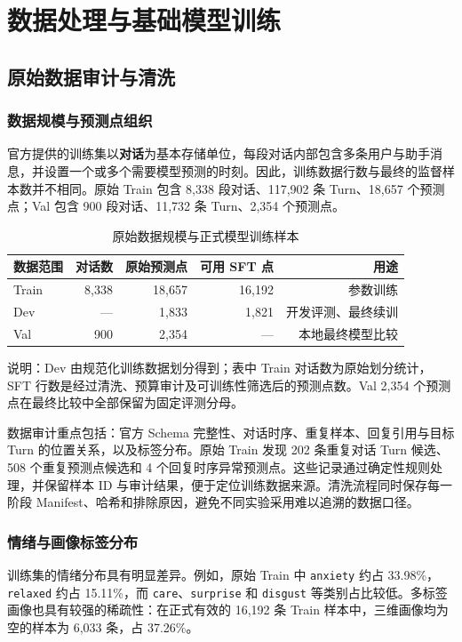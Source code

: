\documentclass[UTF8,a4paper,zihao=-4,oneside]{ctexrep}
\newcommand{\smallnote}[1]{{\footnotesize\color{MutedGray}#1}}
\newcommand{\textterm}[1]{\textbf{#1}}
\begin{document}
\chapter{数据处理与基础模型训练}
\section{原始数据审计与清洗}
\subsection{数据规模与预测点组织}
官方提供的训练集以\textterm{对话}为基本存储单位，每段对话内部包含多条用户与助手消息，并设置一个或多个需要模型预测的时刻。因此，训练数据行数与最终的监督样本数并不相同。原始 Train 包含 8,338 段对话、117,902 条 Turn、18,657 个预测点；Val 包含 900 段对话、11,732 条 Turn、2,354 个预测点。

\begin{table}[htbp]\centering\caption{原始数据规模与正式模型训练样本}\label{tab:dataset-count}
\begin{tabular}{lrrrr}
\toprule
数据范围 & 对话数 & 原始预测点 & 可用 SFT 点 & 用途\\\midrule
Train & 8,338 & 18,657 & 16,192 & 参数训练\\
Dev & --- & 1,833 & 1,821 & 开发评测、最终续训\\
Val & 900 & 2,354 & --- & 本地最终模型比较\\
\bottomrule
\end{tabular}
\end{table}
\smallnote{说明：Dev 由规范化训练数据划分得到；表中 Train 对话数为原始划分统计，SFT 行数是经过清洗、预算审计及可训练性筛选后的预测点数。Val 2,354 个预测点在最终比较中全部保留为固定评测分母。}

数据审计重点包括：官方 Schema 完整性、对话时序、重复样本、回复引用与目标 Turn 的位置关系，以及标签分布。原始 Train 发现 202 条重复对话 Turn 候选、508 个重复预测点候选和 4 个回复时序异常预测点。这些记录通过确定性规则处理，并保留样本 ID 与审计结果，便于定位训练数据来源。清洗流程同时保存每一阶段 Manifest、哈希和排除原因，避免不同实验采用难以追溯的数据口径。

\subsection{情绪与画像标签分布}
训练集的情绪分布具有明显差异。例如，原始 Train 中 \texttt{anxiety} 约占 33.98\%，\texttt{relaxed} 约占 15.11\%，而 \texttt{care}、\texttt{surprise} 和 \texttt{disgust} 等类别占比较低。多标签画像也具有较强的稀疏性：在正式有效的 16,192 条 Train 样本中，三维画像均为空的样本为 6,033 条，占 37.26\%。
\end{document}
